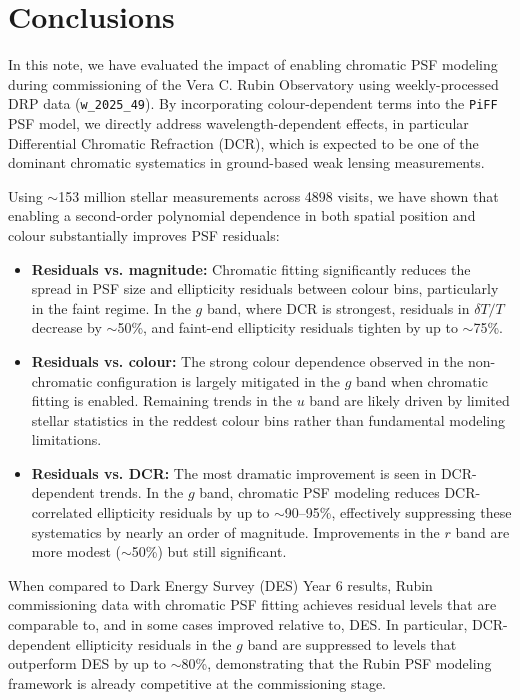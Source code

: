 \section{Conclusions}

In this note, we have evaluated the impact of enabling chromatic PSF modeling during commissioning of the Vera C. Rubin Observatory using weekly-processed DRP data (\texttt{w\_2025\_49}). By incorporating colour-dependent terms into the \texttt{PiFF} PSF model, we directly address wavelength-dependent effects, in particular Differential Chromatic Refraction (DCR), which is expected to be one of the dominant chromatic systematics in ground-based weak lensing measurements.

Using $\sim$153 million stellar measurements across 4898 visits, we have shown that enabling a second-order polynomial dependence in both spatial position and colour substantially improves PSF residuals:

\begin{itemize}
    \item \textbf{Residuals vs. magnitude:} Chromatic fitting significantly reduces the spread in PSF size and ellipticity residuals between colour bins, particularly in the faint regime. In the $g$ band, where DCR is strongest, residuals in $\delta T/T$ decrease by $\sim$50\%, and faint-end ellipticity residuals tighten by up to $\sim$75\%.
    
    \item \textbf{Residuals vs. colour:} The strong colour dependence observed in the non-chromatic configuration is largely mitigated in the $g$ band when chromatic fitting is enabled. Remaining trends in the $u$ band are likely driven by limited stellar statistics in the reddest colour bins rather than fundamental modeling limitations.
    
    \item \textbf{Residuals vs. DCR:} The most dramatic improvement is seen in DCR-dependent trends. In the $g$ band, chromatic PSF modeling reduces DCR-correlated ellipticity residuals by up to $\sim$90--95\%, effectively suppressing these systematics by nearly an order of magnitude. Improvements in the $r$ band are more modest ($\sim$50\%) but still significant.
\end{itemize}

When compared to Dark Energy Survey (DES) Year 6 results, Rubin commissioning data with chromatic PSF fitting achieves residual levels that are comparable to, and in some cases improved relative to, DES. In particular, DCR-dependent ellipticity residuals in the $g$ band are suppressed to levels that outperform DES by up to $\sim$80\%, demonstrating that the Rubin PSF modeling framework is already competitive at the commissioning stage.

